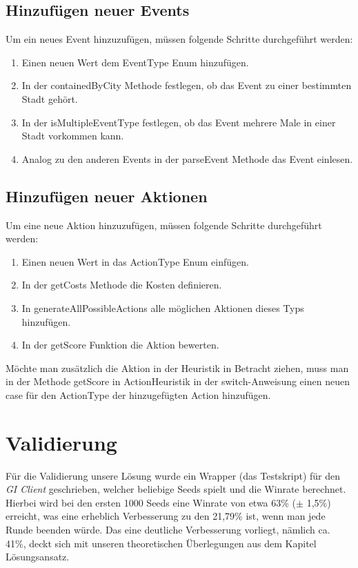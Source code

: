 \documentclass{article}
\let\oldgls\gls
\renewcommand{\gls}[1]{\emph{\oldgls{#1}}} %
\begin{document}
\subsection{Hinzufügen neuer Events}
Um ein neues Event hinzuzufügen, müssen folgende Schritte durchgeführt werden:
\begin{enumerate}
    \item Einen neuen Wert dem EventType Enum hinzufügen.
    \item In der containedByCity Methode festlegen, ob das Event zu einer bestimmten Stadt gehört.
    \item In der isMultipleEventType festlegen, ob das Event mehrere Male in einer Stadt vorkommen kann.
    \item Analog zu den anderen Events in der parseEvent Methode das Event einlesen.
\end{enumerate}
\subsection{Hinzufügen neuer Aktionen}
Um eine neue Aktion hinzuzufügen, müssen folgende Schritte durchgeführt werden:
\begin{enumerate}
    \item Einen neuen Wert in das ActionType Enum einfügen.
    \item In der getCosts Methode die Kosten definieren.
    \item In generateAllPossibleActions alle möglichen Aktionen dieses Typs hinzufügen.
    \item In der getScore Funktion die Aktion bewerten.
\end{enumerate}
Möchte man zusätzlich die Aktion in der Heuristik in Betracht ziehen, muss man in der Methode getScore in ActionHeuristik in der switch-Anweisung einen neuen case für den ActionType der hinzugefügten Action hinzufügen.
\newpage
\section{Validierung}
Für die Validierung unsere Lösung wurde ein Wrapper (das Testskript) für den \gls{GI Client} geschrieben, welcher beliebige Seeds spielt und die Winrate berechnet. Hierbei wird bei den ersten 1000 Seeds eine Winrate von etwa 63\% ($\pm$ 1,5\%) erreicht, was eine erheblich Verbesserung zu den 21,79\% ist, wenn man jede Runde beenden würde. Das eine deutliche Verbesserung vorliegt, nämlich ca. 41\%, deckt sich mit unseren theoretischen Überlegungen aus dem Kapitel Lösungsansatz.
\end{document}
